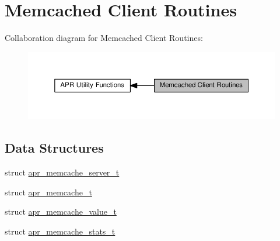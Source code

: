 \hypertarget{group__APR__Util__MC}{}\section{Memcached Client Routines}
\label{group__APR__Util__MC}
Collaboration diagram for Memcached Client Routines\+:
\nopagebreak
\begin{figure}[H]
\begin{center}
\leavevmode
\includegraphics[width=350pt]{group__APR__Util__MC}
\end{center}
\end{figure}
\subsection*{Data Structures}
\begin{DoxyCompactItemize}
\item 
struct \hyperlink{structapr__memcache__server__t}{apr\+\_\+memcache\+\_\+server\+\_\+t}
\item 
struct \hyperlink{structapr__memcache__t}{apr\+\_\+memcache\+\_\+t}
\item 
struct \hyperlink{structapr__memcache__value__t}{apr\+\_\+memcache\+\_\+value\+\_\+t}
\item 
struct \hyperlink{structapr__memcache__stats__t}{apr\+\_\+memcache\+\_\+stats\+\_\+t}
\end{DoxyCompactItemize}
